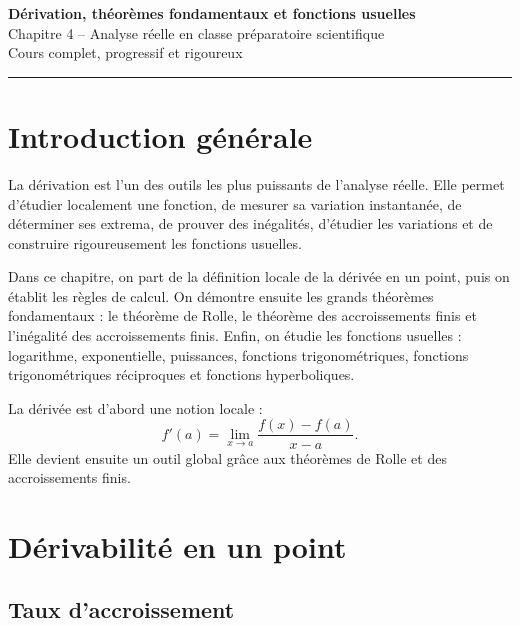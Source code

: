\documentclass[11pt,a4paper]{article}
\begin{document}
\begin{center}
    {\Huge \textbf{Dérivation, théorèmes fondamentaux et fonctions usuelles}}\\[2mm]
    {\Large Chapitre 4 -- Analyse réelle en classe préparatoire scientifique}\\[2mm]
    {\large Cours complet, progressif et rigoureux}\\[2mm]
    \rule{0.88\linewidth}{0.5pt}
\end{center}

\vspace{0.4cm}

\tableofcontents

\newpage

\section*{Introduction générale}

La dérivation est l'un des outils les plus puissants de l'analyse réelle.  
Elle permet d'étudier localement une fonction, de mesurer sa variation instantanée, de déterminer ses extrema, de prouver des inégalités, d'étudier les variations et de construire rigoureusement les fonctions usuelles.

Dans ce chapitre, on part de la définition locale de la dérivée en un point, puis on établit les règles de calcul.  
On démontre ensuite les grands théorèmes fondamentaux : le théorème de Rolle, le théorème des accroissements finis et l'inégalité des accroissements finis.  
Enfin, on étudie les fonctions usuelles : logarithme, exponentielle, puissances, fonctions trigonométriques, fonctions trigonométriques réciproques et fonctions hyperboliques.

\begin{retenirbox}
La dérivée est d'abord une notion locale :
\[
f'(a)=\lim_{x\to a}\frac{f(x)-f(a)}{x-a}.
\]
Elle devient ensuite un outil global grâce aux théorèmes de Rolle et des accroissements finis.
\end{retenirbox}

\section{Dérivabilité en un point}

\subsection{Taux d'accroissement}
\end{document}
